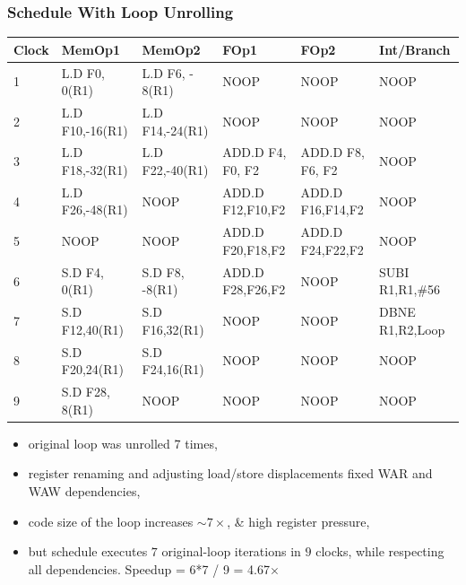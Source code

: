 \documentclass{beamer}
\renewcommand{\emph}[1]{\textcolor{structure}{#1}}
\newcommand{\emp}[1]{\textcolor{DikuRed}{ #1}}
\begin{document}
\begin{frame}[fragile,t]
    \frametitle{Schedule With Loop Unrolling}


\begin{tiny}
\begin{tabular}{llllll}
\hline
Clock   & MemOp1         & MemOp2         & FOp1            & FOp2             & Int/Branch \\\hline
1       & L.D F0,   0(R1)& L.D F6, - 8(R1)& NOOP            & NOOP             & NOOP \\
2       & L.D F10,-16(R1)& L.D F14,-24(R1)& NOOP            & NOOP             & NOOP \\
3       & L.D F18,-32(R1)& L.D F22,-40(R1)& ADD.D F4, F0, F2& ADD.D F8, F6, F2 & NOOP \\
4       & L.D F26,-48(R1)& NOOP           & ADD.D F12,F10,F2& ADD.D F16,F14,F2 & NOOP \\
5       & NOOP           & NOOP           & ADD.D F20,F18,F2& ADD.D F24,F22,F2 & NOOP\\
6       & S.D F4,  0(R1) & S.D F8, -8(R1) & ADD.D F28,F26,F2& NOOP             & SUBI R1,R1,\#56\\
7       & S.D F12,40(R1) & S.D F16,32(R1) & NOOP            & NOOP             & DBNE R1,R2,Loop\\
8       & S.D F20,24(R1) & S.D F24,16(R1) & NOOP            & NOOP             & NOOP\\
9       & S.D F28, 8(R1) & NOOP           & NOOP            & NOOP             & NOOP\\\hline
\end{tabular}
\end{tiny}

\smallskip

\begin{itemize}
    \item original loop was unrolled 7 times,
    \item register renaming and adjusting load/store displacements fixed WAR and WAW dependencies,
    \item \emp{code size of the loop increases $\sim7\times$, \& high register pressure,} 
    \item \emph{but schedule executes $7$ original-loop iterations in $9$ clocks, while
            respecting all dependencies. Speedup = 6*7 / 9 = 4.67$\times$}
\end  {itemize}

\end{frame}
\end{document}
